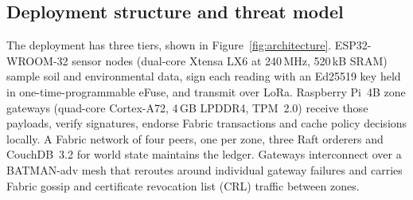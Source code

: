 \documentclass[a4paper,fleqn]{cas-dc}
\begin{document}
\subsection{Deployment structure and threat model}
\label{subsec:threat}

The deployment has three tiers, shown in Figure~\ref{fig:architecture}.
ESP32-WROOM-32 sensor nodes (dual-core Xtensa LX6 at 240\,MHz, 520\,kB SRAM)
sample soil and environmental data, sign each reading with an Ed25519 key
held in one-time-programmable eFuse, and transmit over LoRa. Raspberry Pi~4B
zone gateways (quad-core Cortex-A72, 4\,GB LPDDR4, TPM~2.0) receive those
payloads, verify signatures, endorse Fabric transactions and cache policy
decisions locally. A Fabric network of four peers, one per zone, three Raft
orderers and CouchDB~3.2 for world state maintains the ledger. Gateways
interconnect over a BATMAN-adv mesh \cite{batman2010} that reroutes around
individual gateway failures and carries Fabric gossip and certificate
revocation list (CRL) traffic between zones.
\end{document}
